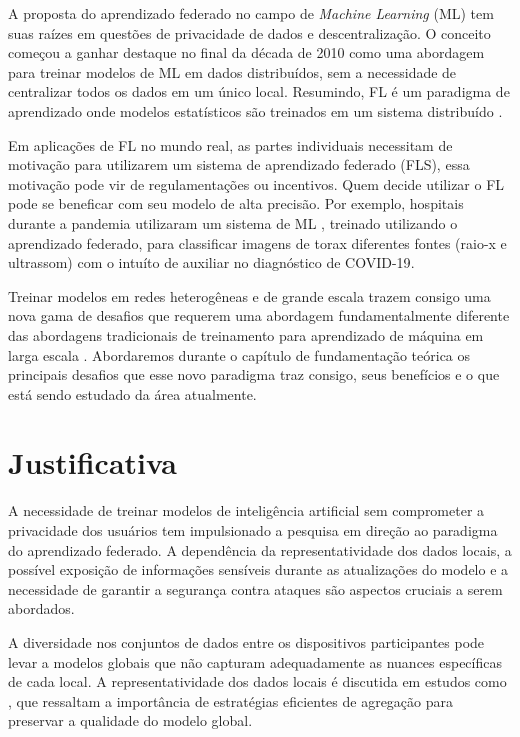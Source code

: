 A proposta do aprendizado federado no campo de \emph{Machine Learning} (ML) tem suas raízes em questões de privacidade de dados e descentralização. O conceito começou a ganhar destaque no final da década de 2010 como uma abordagem para treinar modelos de ML em dados distribuídos, sem a necessidade de centralizar todos os dados em um único local. Resumindo, FL é um paradigma de aprendizado onde modelos estatísticos são treinados em um sistema distribuído \cite{li2020preserving}.

Em aplicações de FL no mundo real, as partes individuais necessitam de motivação para utilizarem um  sistema de aprendizado federado (FLS), essa motivação pode vir de regulamentações ou incentivos. Quem decide utilizar o FL pode se beneficar com seu modelo de alta precisão\cite{LI}. Por exemplo, hospitais durante a pandemia utilizaram um sistema de ML , treinado utilizando o aprendizado federado, para classificar imagens de torax diferentes fontes (raio-x e ultrassom) com o intuíto de auxiliar no diagnóstico de COVID-19\cite{qayyum2022collaborative}.

Treinar modelos em redes heterogêneas e de grande escala trazem consigo uma nova gama de desafios que requerem uma abordagem fundamentalmente diferente das abordagens tradicionais de treinamento para aprendizado de máquina em larga escala \cite{li3}. Abordaremos durante o capítulo de fundamentação teórica os principais desafios que esse novo paradigma traz consigo, seus benefícios e o que está sendo estudado da área atualmente.

\section{Justificativa}
\label{sec:justificativa}

A necessidade de treinar modelos de inteligência artificial sem comprometer a privacidade dos usuários tem impulsionado a pesquisa em direção ao paradigma do aprendizado federado. A dependência da representatividade dos dados locais, a possível exposição de informações sensíveis durante as atualizações do modelo e a necessidade de garantir a segurança contra ataques são aspectos cruciais a serem abordados.

A diversidade nos conjuntos de dados entre os dispositivos participantes pode levar a modelos globais que não capturam adequadamente as nuances específicas de cada local. A representatividade dos dados locais é discutida em estudos como \cite{mcmahan2017communication}, que ressaltam a importância de estratégias eficientes de agregação para preservar a qualidade do modelo global.

